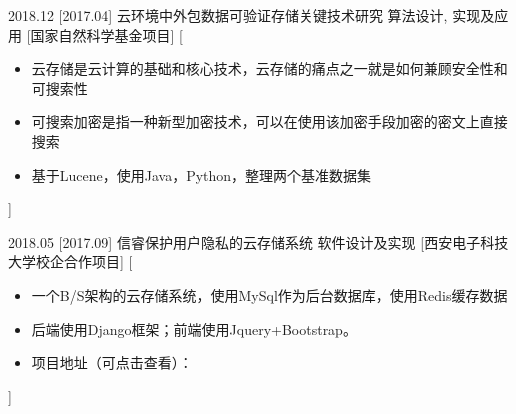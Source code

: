 \documentclass[zh]{resume}
\begin{document}
\begin{experiences}
  \experience
    {2018.12}%
    [2017.04]%
    {云环境中外包数据可验证存储关键技术研究}%
    {算法设计, 实现及应用}%
    [国家自然科学基金项目]%
    [\begin{itemize}
      \item{\icon{\faFlag}} 云存储是云计算的基础和核心技术，云存储的痛点之一就是如何兼顾安全性和可搜索性
      \item{\icon{\faFlag}} 可搜索加密是指一种新型加密技术，可以在使用该加密手段加密的密文上直接搜索
      \item{\icon{\faCheck}} 基于Lucene，使用Java，Python，整理两个基准数据集  %
    \end{itemize}]%

  \separator{0.1em}
%


  \separator{0.1em}
  \experience
    {2018.05}%
    [2017.09]%
    {信睿保护用户隐私的云存储系统}%
    {软件设计及实现}%
    [西安电子科技大学校企合作项目]%
    [\begin{itemize}
      \item{\icon{\faFlag}} 一个B/S架构的云存储系统，使用MySql作为后台数据库，使用Redis缓存数据
      \item{\icon{\faFlag}} 后端使用Django框架；前端使用Jquery+Bootstrap。
      \item{\icon{\faCheck}} 项目地址（可点击查看）： 
    \end{itemize}]%




\end{experiences}
\end{document}
